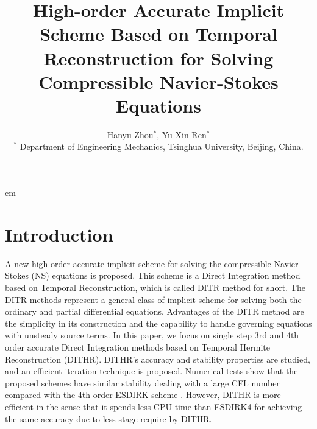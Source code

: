 \documentclass[10pt]{article}
\title{
\bf 
High-order Accurate Implicit Scheme Based on 
Temporal Reconstruction for Solving Compressible 
Navier-Stokes Equations
}
\author{
Hanyu Zhou$^{*}$, Yu-Xin Ren$^{*}$ \\
$^{*}$ Department of Engineering Mechanics, Tsinghua University, Beijing, China.
}
\date{}
\begin{document}
\maketitle
\afterpage{\fancyhead{}}

\centerline{
}
 cm

\section{Introduction}


A new high-order accurate implicit scheme for
solving the compressible Navier-Stokes (NS) equations is proposed.
This scheme is a Direct Integration method based on Temporal Reconstruction,
which is called DITR method for short.
The DITR methods represent a general class of implicit scheme for solving
both the ordinary and partial differential equations.
Advantages of the DITR method are the simplicity in its construction
and the capability to handle governing equations
with unsteady source terms.
In this paper, we focus on single step 3rd and 4th order accurate
Direct Integration methods based on Temporal
Hermite Reconstruction (DITHR).
DITHR's accuracy and stability properties are studied,
and an efficient iteration technique is proposed.
Numerical tests show that the proposed schemes have 
similar stability dealing with a large CFL number 
compared with the 4th order ESDIRK scheme \cite{kennedy2003additiveARK}. %
However, DITHR is more efficient in the sense that it spends less CPU time 
than ESDIRK4 for achieving the same accuracy
due to less stage require by DITHR.
\end{document}
